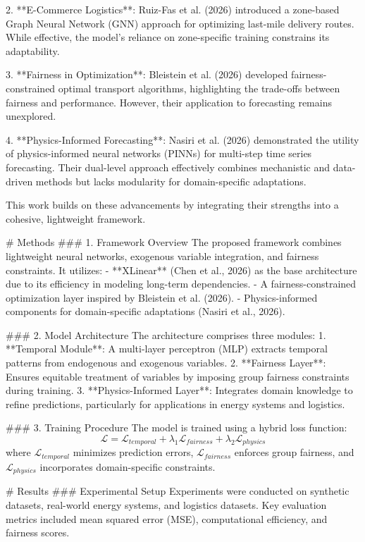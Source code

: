 2. **E-Commerce Logistics**: Ruiz-Fas et al. (2026) introduced a zone-based Graph Neural Network (GNN) approach for optimizing last-mile delivery routes. While effective, the model's reliance on zone-specific training constrains its adaptability.

3. **Fairness in Optimization**: Bleistein et al. (2026) developed fairness-constrained optimal transport algorithms, highlighting the trade-offs between fairness and performance. However, their application to forecasting remains unexplored.

4. **Physics-Informed Forecasting**: Nasiri et al. (2026) demonstrated the utility of physics-informed neural networks (PINNs) for multi-step time series forecasting. Their dual-level approach effectively combines mechanistic and data-driven methods but lacks modularity for domain-specific adaptations.

This work builds on these advancements by integrating their strengths into a cohesive, lightweight framework.

# Methods
### 1. Framework Overview
The proposed framework combines lightweight neural networks, exogenous variable integration, and fairness constraints. It utilizes:
- **XLinear** (Chen et al., 2026) as the base architecture due to its efficiency in modeling long-term dependencies.
- A fairness-constrained optimization layer inspired by Bleistein et al. (2026).
- Physics-informed components for domain-specific adaptations (Nasiri et al., 2026).

### 2. Model Architecture
The architecture comprises three modules:
1. **Temporal Module**: A multi-layer perceptron (MLP) extracts temporal patterns from endogenous and exogenous variables.
2. **Fairness Layer**: Ensures equitable treatment of variables by imposing group fairness constraints during training.
3. **Physics-Informed Layer**: Integrates domain knowledge to refine predictions, particularly for applications in energy systems and logistics.

### 3. Training Procedure
The model is trained using a hybrid loss function:
\[
\mathcal{L} = \mathcal{L}_{temporal} + \lambda_1 \mathcal{L}_{fairness} + \lambda_2 \mathcal{L}_{physics}
\]
where \(\mathcal{L}_{temporal}\) minimizes prediction errors, \(\mathcal{L}_{fairness}\) enforces group fairness, and \(\mathcal{L}_{physics}\) incorporates domain-specific constraints.

# Results
### Experimental Setup
Experiments were conducted on synthetic datasets, real-world energy systems, and logistics datasets. Key evaluation metrics included mean squared error (MSE), computational efficiency, and fairness scores.

